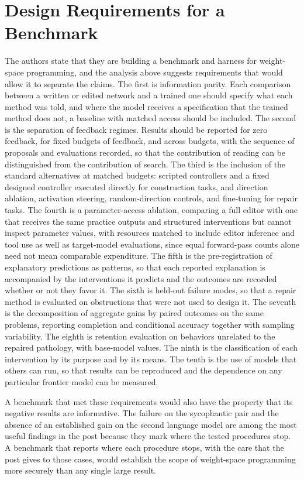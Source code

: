 \documentclass[11pt]{article}
\begin{document}
\section{Design Requirements for a Benchmark}

The authors state that they are building a benchmark and harness for weight-space programming, and the analysis above suggests requirements that would allow it to separate the claims. The first is information parity. Each comparison between a written or edited network and a trained one should specify what each method was told, and where the model receives a specification that the trained method does not, a baseline with matched access should be included. The second is the separation of feedback regimes. Results should be reported for zero feedback, for fixed budgets of feedback, and across budgets, with the sequence of proposals and evaluations recorded, so that the contribution of reading can be distinguished from the contribution of search. The third is the inclusion of the standard alternatives at matched budgets: scripted controllers and a fixed designed controller executed directly for construction tasks, and direction ablation, activation steering, random-direction controls, and fine-tuning for repair tasks. The fourth is a parameter-access ablation, comparing a full editor with one that receives the same practice outputs and structured interventions but cannot inspect parameter values, with resources matched to include editor inference and tool use as well as target-model evaluations, since equal forward-pass counts alone need not mean comparable expenditure. The fifth is the pre-registration of explanatory predictions as patterns, so that each reported explanation is accompanied by the interventions it predicts and the outcomes are recorded whether or not they favor it. The sixth is held-out failure modes, so that a repair method is evaluated on obstructions that were not used to design it. The seventh is the decomposition of aggregate gains by paired outcomes on the same problems, reporting completion and conditional accuracy together with sampling variability. The eighth is retention evaluation on behaviors unrelated to the repaired pathology, with base-model values. The ninth is the classification of each intervention by its purpose and by its means. The tenth is the use of models that others can run, so that results can be reproduced and the dependence on any particular frontier model can be measured.

A benchmark that met these requirements would also have the property that its negative results are informative. The failure on the sycophantic pair and the absence of an established gain on the second language model are among the most useful findings in the post because they mark where the tested procedures stop. A benchmark that reports where each procedure stops, with the care that the post gives to those cases, would establish the scope of weight-space programming more securely than any single large result.
\end{document}
